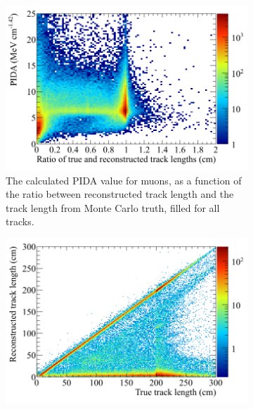 \begin{figure}
  \centering
  \begin{subfigure}{0.48\textwidth}
        \centering
        \includegraphics[width=\textwidth]{ProtonEnrich_500V_v05_14_00_trackpmtrackdc_Muon_All_MCRecoTrackRatio}
        \caption{The calculated PIDA value for muons, as a function of the ratio between reconstructed track length and the track length from Monte Carlo truth, filled for all tracks.}
        \label{fig:CRY_MCRecoRat_Muon_All}
  \end{subfigure}%
  \hspace{0.03\textwidth}%
  \begin{subfigure}{0.48\textwidth}
        \centering
        \includegraphics[width=\textwidth]{ProtonEnrich_500V_v05_14_00_trackpmtrackdc_Muon_All_MCRecoTrackLength}

\end{subfigure}
\end{figure}
